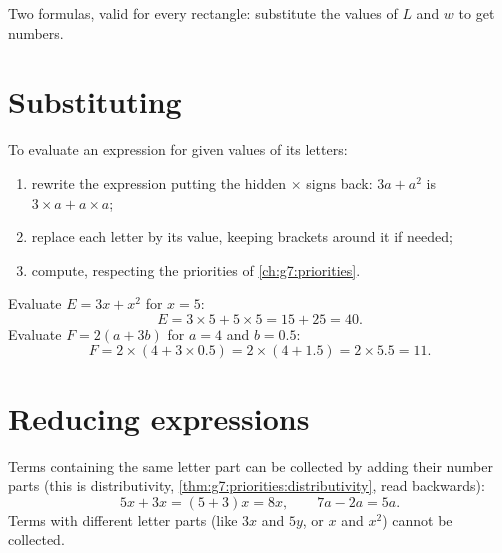 \begin{omfigure}

{\small Two formulas, valid for every rectangle: substitute the values
of $L$ and $w$ to get numbers.}
\end{omfigure}

\section{Substituting}

\begin{method}\label{met:g7:literal:substitute}
To evaluate an expression for given values of its letters:
\begin{enumerate}
  \item rewrite the expression putting the hidden $\times$ signs back:
        $3a + a^2$ is $3 \times a + a \times a$;
  \item replace each letter by its value, keeping brackets around it
        if needed;
  \item compute, respecting the priorities of
        \cref{ch:g7:priorities}.
\end{enumerate}
\end{method}

\begin{example}\label{ex:g7:literal:substitute}
Evaluate $E = 3x + x^2$ for $x = 5$:
\[
E = 3 \times 5 + 5 \times 5 = 15 + 25 = 40 .
\]
Evaluate $F = 2(a + 3b)$ for $a = 4$ and $b = 0.5$:
\[
F = 2 \times (4 + 3 \times 0.5) = 2 \times (4 + 1.5) = 2 \times 5.5
= 11 .
\]
\end{example}

\section{Reducing expressions}

\begin{proposition}\label{prop:g7:literal:reduce}
Terms containing the same letter part can be collected by adding their
number parts (this is distributivity,
\cref{thm:g7:priorities:distributivity}, read backwards):
\[
5x + 3x = (5 + 3)x = 8x,
\qquad
7a - 2a = 5a .
\]
Terms with different letter parts (like $3x$ and $5y$, or $x$ and
$x^2$) cannot be collected.
\end{proposition}

